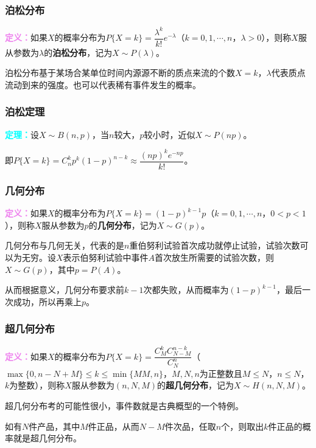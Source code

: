 \subsubsection{泊松分布}

\textcolor{violet}{\textbf{定义：}}如果$X$的概率分布为$P\{X=k\}=\dfrac{\lambda^k}{k!}e^{-\lambda}$（$k=0,1,\cdots,n$，$\lambda>0$），则称$X$服从参数为$\lambda$的\textbf{泊松分布}，记为$X\sim P(\lambda)$。

泊松分布基于某场合某单位时间内源源不断的质点来流的个数$X=k$，$\lambda$代表质点流动到来的强度。也可以代表稀有事件发生的概率。

\subsubsection{泊松定理}

\textcolor{aqua}{\textbf{定理：}}设$X\sim B(n,p)$，当$n$较大，$p$较小时，近似$X\sim P(np)$。

即$P\{X=k\}=C_n^kp^k(1-p)^{n-k}\approx\dfrac{(np)^ke^{-np}}{k!}$。

\subsubsection{几何分布}

\textcolor{violet}{\textbf{定义：}}如果$X$的概率分布为$P\{X=k\}=(1-p)^{k-1}p$（$k=0,1,\cdots,n$，$0<p<1$），则称$X$服从参数为$p$的\textbf{几何分布}，记为$X\sim G(p)$。

几何分布与几何无关，代表的是$n$重伯努利试验首次成功就停止试验，试验次数可以为无穷。设$X$表示伯努利试验中事件$A$首次放生所需要的试验次数，则$X\sim G(p)$，其中$p=P(A)$。

从而根据意义，几何分布要求前$k-1$次都失败，从而概率为$(1-p)^{k-1}$，最后一次成功，所以再乘上$p$。

\subsubsection{超几何分布}

\textcolor{violet}{\textbf{定义：}}如果$X$的概率分布为$P\{X=k\}=\dfrac{C_M^kC_{N-M}^{n-k}}{C_N^n}$（$\max\{0,n-N+M\}\leqslant k\leqslant\min\{MM,n\}$，$M,N,n$为正整数且$M\leqslant N$，$n\leqslant N$，$k$为整数），则称$X$服从参数为$(n,N,M)$的\textbf{超几何分布}，记为$X\sim H(n,N,M)$。

超几何分布考的可能性很小，事件数就是古典概型的一个特例。

如有$N$件产品，其中$M$件正品，从而$N-M$件次品，任取$n$个，则取出$k$件正品的概率就是超几何分布。

